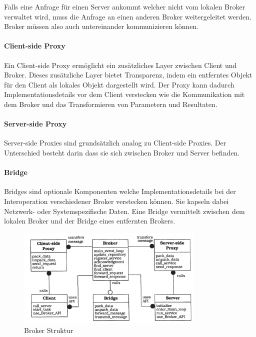 Falls eine Anfrage für einen Server ankommt welcher nicht vom lokalen Broker verwaltet wird, muss die Anfrage an einen anderen Broker weitergeleitet werden. Broker müssen also auch untereinander kommunizieren können.

\paragraph{Client-side Proxy}
Ein Client-side Proxy ermöglicht ein zusätzliches Layer zwischen Client und Broker. Dieses zusätzliche Layer bietet Transparenz, indem ein entferntes Objekt für den Client als lokales Objekt dargestellt wird. Der Proxy kann dadurch Implementationsdetails vor dem Client verstecken wie die Kommunikation mit dem Broker und das Transformieren von Parametern und Resultaten.

\paragraph{Server-side Proxy}
Server-side Proxies sind grundsätzlich analog zu Client-side Proxies. Der Unterschied besteht darin dass sie sich zwischen Broker und Server befinden.

\paragraph{Bridge}
Bridges sind optionale Komponenten welche Implementationsdetails bei der Interoperation verschiedener Broker verstecken können. Sie kapseln dabei Netzwerk- oder Systemspezifische Daten. Eine Bridge vermittelt zwischen dem lokalen Broker und der Bridge eines entfernten Brokers.

\begin{figure}[H]
	\centering
	\includegraphics[width=0.8\textwidth]{figures/06-broker-1}
	\caption{Broker Struktur}
\end{figure}

